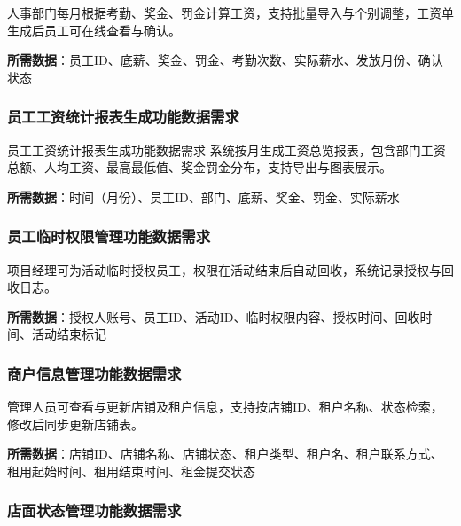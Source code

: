 \documentclass[]{article}
\begin{document}
人事部门每月根据考勤、奖金、罚金计算工资，支持批量导入与个别调整，工资单生成后员工可在线查看与确认。

\textbf{所需数据}：员工ID、底薪、奖金、罚金、考勤次数、实际薪水、发放月份、确认状态

\hypertarget{ux5458ux5de5ux5de5ux8d44ux7edfux8ba1ux62a5ux8868ux751fux6210ux529fux80fdux6570ux636eux9700ux6c42}{%
\subsubsection{员工工资统计报表生成功能数据需求}\label{ux5458ux5de5ux5de5ux8d44ux7edfux8ba1ux62a5ux8868ux751fux6210ux529fux80fdux6570ux636eux9700ux6c42}}

员工工资统计报表生成功能数据需求
系统按月生成工资总览报表，包含部门工资总额、人均工资、最高最低值、奖金罚金分布，支持导出与图表展示。

\textbf{所需数据}：时间（月份）、员工ID、部门、底薪、奖金、罚金、实际薪水

\hypertarget{ux5458ux5de5ux4e34ux65f6ux6743ux9650ux7ba1ux7406ux529fux80fdux6570ux636eux9700ux6c42}{%
\subsubsection{员工临时权限管理功能数据需求}\label{ux5458ux5de5ux4e34ux65f6ux6743ux9650ux7ba1ux7406ux529fux80fdux6570ux636eux9700ux6c42}}

项目经理可为活动临时授权员工，权限在活动结束后自动回收，系统记录授权与回收日志。

\textbf{所需数据}：授权人账号、员工ID、活动ID、临时权限内容、授权时间、回收时间、活动结束标记

\hypertarget{ux5546ux6237ux4fe1ux606fux7ba1ux7406ux529fux80fdux6570ux636eux9700ux6c42}{%
\subsubsection{商户信息管理功能数据需求}\label{ux5546ux6237ux4fe1ux606fux7ba1ux7406ux529fux80fdux6570ux636eux9700ux6c42}}

管理人员可查看与更新店铺及租户信息，支持按店铺ID、租户名称、状态检索，修改后同步更新店铺表。

\textbf{所需数据}：店铺ID、店铺名称、店铺状态、租户类型、租户名、租户联系方式、租用起始时间、租用结束时间、租金提交状态

\hypertarget{ux5e97ux9762ux72b6ux6001ux7ba1ux7406ux529fux80fdux6570ux636eux9700ux6c42}{%
\subsubsection{店面状态管理功能数据需求}\label{ux5e97ux9762ux72b6ux6001ux7ba1ux7406ux529fux80fdux6570ux636eux9700ux6c42}}
\end{document}
